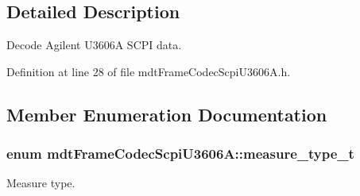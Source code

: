 \subsection{Detailed Description}
Decode Agilent U3606A SCPI data. 

Definition at line 28 of file mdtFrameCodecScpiU3606A.h.



\subsection{Member Enumeration Documentation}
\hypertarget{classmdt_frame_codec_scpi_u3606_a_a3d7a1de14d77797a08e3d2991fa9f004}{
\subsubsection[{measure\_\-type\_\-t}]{\setlength{\rightskip}{0pt plus 5cm}enum {\bf mdtFrameCodecScpiU3606A::measure\_\-type\_\-t}}}
\label{classmdt_frame_codec_scpi_u3606_a_a3d7a1de14d77797a08e3d2991fa9f004}


Measure type. 

